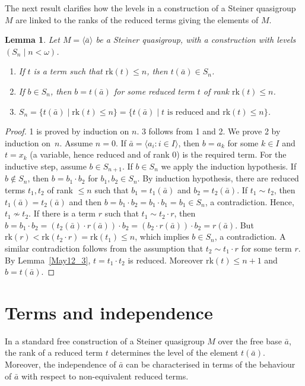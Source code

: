 \documentclass[a4paper, 11pt]{article}
\newcommand{\rk}{\mathrm{rk}}
\theoremstyle{note}
\newtheorem{lemma}[thm]{Lemma}
\begin{document}
The next result clarifies how the levels in a construction of a Steiner quasigroup $M$ are linked to the ranks of the reduced terms giving the elements of $M$.
	\begin{lemma}\label{May12_4} Let $M=\langle \bar{a}\rangle$ be a  Steiner quasigroup, with a construction  with levels $(S_n\mid n<\omega)$.
		\begin{enumerate}
			\item If $t$ is a term such that $\rk(t)\leq n$, then $t(\bar{a})\in S_n$.
			\item If $b\in S_n$, then  $b= t(\bar{a})$  for some reduced term $t$ of rank $\rk(t)\leq n$.
			\item  $S_n= \{t(\bar{a})\mid \rk(t)\leq n\} = \{t(\bar{a})\mid t \mbox{ is reduced and } \rk(t)\leq n\}$.
		\end{enumerate}
	\end{lemma}
	\begin{proof} 1 is proved by induction on $n$.  3 follows from 1 and 2. We prove 2 by induction on~$n$.  Assume $n=0$.  If $\bar{a}= \langle a_i : i \in I \rangle$, then $b =a_k$  for some $k \in I$ and $t=x_k$ (a variable, hence reduced and of rank $0$) is the required term. For the inductive step, assume $b\in S_{n+1}$.  If $b\in S_n$ we apply the induction hypothesis. If $b\not\in S_n$, then $b= b_1\cdot b_2$ for $b_1,b_2\in S_n$.  By induction hypothesis, there are reduced terms  $t_1,t_2$ of rank $\leq n$ such that $b_1= t_1(\bar{a})$ and $b_2= t_2(\bar{a})$.  If $t_1\sim t_2$, then $t_1(\bar{a})=t_2(\bar{a})$ and then $b= b_1\cdot b_2 = b_1\cdot b_1 = b_1 \in S_n$, a contradiction. Hence, $t_1\not\sim t_2$.  If there is a term $r$ such that $t_1\sim t_2\cdot r$, then  $b= b_1\cdot b_2=(t_2(\bar{a})\cdot r(\bar{a}))\cdot b_2 = (b_2\cdot r(\bar{a}))\cdot b_2 = r(\bar{a})$. But $\rk(r) <\rk(t_2\cdot r) =\rk(t_1)\leq n$, which implies $b\in S_n$, a contradiction. A similar contradiction follows from the assumption that $t_2\sim t_1\cdot r$ for some term $r$. By  Lemma~\ref{May12_3}, $t= t_1\cdot t_2$ is reduced. Moreover $\rk(t)\leq n+1$  and  $b= t(\bar{a})$.
	\end{proof}
	
	
	\section{Terms and independence}

In a standard free construction of a Steiner quasigroup $M$ over the free base $\bar{a}$, the rank of a reduced term $t$ determines the level of the element $t(\bar{a})$. Moreover, the independence of $\bar{a}$ can be characterised in terms of the behaviour of $\bar{a}$ with respect to non-equivalent reduced terms.
\end{document}
